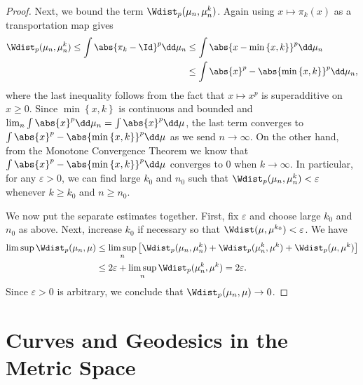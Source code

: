 \documentclass[oneside,reqno,letterpaper]{amsart}
\begin{document}
\begin{proof}
  Next, we bound the term \(\Wdist_p(\mu_n, \mu_n^k)\).
  Again using \(x \mapsto \pi_k(x)\) as a transportation map gives
  \begin{align*}
    \Wdist_p(\mu_n, \mu_n^k)
    \leq \int \abs{\pi_k - \Id}^p \dd\mu_n
    &\leq \int \abs{x - \min\left\{x, k\right\}}^p \dd\mu_n\\
    &\leq \int \abs{x}^p - \abs{\min\left\{x, k\right\}}^p \dd\mu_n,
  \end{align*}
  where the last inequality follows from the fact that \(x \mapsto x^p\) is superadditive on \(x \geq 0\).
  Since \(\min\left\{x, k \right\}\) is continuous and bounded and \(\lim_n \int \abs{x}^p \dd\mu_n = \int \abs{x}^p \dd\mu\), the last term converges to \(\int \abs{x}^p - \abs{\min\left\{x, k \right\}}^p \dd \mu\) as we send \(n \to \infty\).
  On the other hand, from the Monotone Convergence Theorem we know that \(\int \abs{x}^p - \abs{\min\left\{x, k \right\}}^p \dd \mu\) converges to \(0\) when \(k \to \infty\).
  In particular, for any \(\varepsilon > 0\), we can find large \(k_0\) and \(n_0\) such that \(\Wdist_p(\mu_n, \mu_n^k) < \varepsilon\) whenever \(k \geq k_0\) and \(n \geq n_0\).

  We now put the separate estimates together.
  First, fix \(\varepsilon\) and choose large \(k_0\) and \(n_0\) as above.
  Next, increase \(k_0\) if necessary so that \(\Wdist(\mu, \mu^{k_0}) < \varepsilon\).
  We have
  \begin{align*}
    \limsup \Wdist_p(\mu_n, \mu)
    &\leq \limsup_n \left[ \Wdist_p(\mu_n, \mu_n^k)
      + \Wdist_p(\mu_n^k, \mu^k)
      + \Wdist_p(\mu, \mu^k) \right] \\
    &\leq 2\varepsilon + \limsup_n \Wdist_p(\mu_n^k, \mu^k)
    = 2\varepsilon.
  \end{align*}
  Since \(\varepsilon > 0\) is arbitrary, we conclude that \(\Wdist_p(\mu_n, \mu) \to 0\).
\end{proof}




\section{Curves and Geodesics in the Metric Space}
\end{document}
